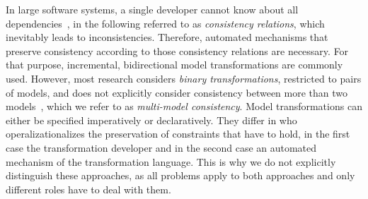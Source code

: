 In large software systems, a single developer cannot know about all dependencies~\cite{petrenko2008a}, %
in the following referred to as \emph{consistency relations}, which inevitably leads to inconsistencies. 
Therefore, automated mechanisms that preserve consistency according to those consistency relations are necessary. 
For that purpose, incremental, bidirectional model transformations %
are commonly used. However, most research considers \emph{binary transformations}, restricted to pairs of models, and does not explicitly consider consistency between more than two models~\cite{stevens2017a}, which we refer to as \emph{multi-model consistency}.
Model transformations can either be specified imperatively or declaratively. They differ in who operalizationalizes the preservation of constraints that have to hold, in the first case the transformation developer and in the second case an automated mechanism of the transformation language. This is why we do not explicitly distinguish these approaches, as all problems apply to both approaches and only different roles have to deal with them. 

